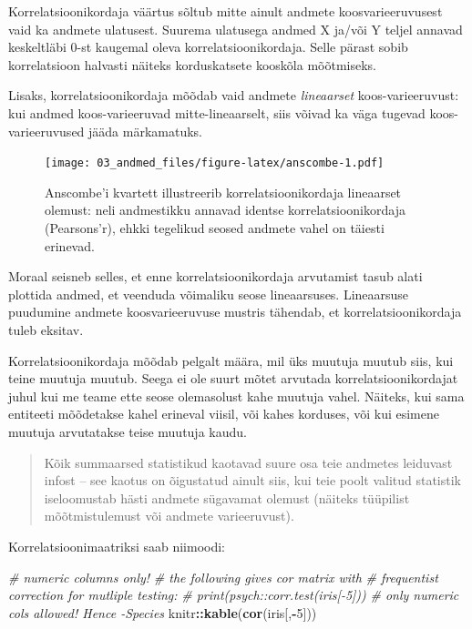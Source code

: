 \documentclass[]{book}
\newenvironment{Shaded}{\begin{snugshade}}{\end{snugshade}}
\newcommand{\KeywordTok}[1]{\textcolor[rgb]{0.13,0.29,0.53}{\textbf{#1}}}
\newcommand{\DecValTok}[1]{\textcolor[rgb]{0.00,0.00,0.81}{#1}}
\newcommand{\CommentTok}[1]{\textcolor[rgb]{0.56,0.35,0.01}{\textit{#1}}}
\newcommand{\OperatorTok}[1]{\textcolor[rgb]{0.81,0.36,0.00}{\textbf{#1}}}
\newcommand{\NormalTok}[1]{#1}
\begin{document}
Korrelatsioonikordaja väärtus sõltub mitte ainult andmete
koosvarieeruvusest vaid ka andmete ulatusest. Suurema ulatusega andmed X
ja/või Y teljel annavad keskeltläbi 0-st kaugemal oleva
korrelatsioonikordaja. Selle pärast sobib korrelatsioon halvasti näiteks
korduskatsete kooskõla mõõtmiseks.

Lisaks, korrelatsioonikordaja mõõdab vaid andmete \emph{lineaarset}
koos-varieeruvust: kui andmed koos-varieeruvad mitte-lineaarselt, siis
võivad ka väga tugevad koos-varieeruvused jääda märkamatuks.






\begin{figure}
\centering
\texttt{[image: 03\_andmed\_files/figure-latex/anscombe-1.pdf]}
\caption{\label{fig:anscombe}Anscombe'i kvartett illustreerib korrelatsioonikordaja
lineaarset olemust: neli andmestikku annavad identse
korrelatsioonikordaja (Pearsons'r), ehkki tegelikud seosed andmete vahel
on täiesti erinevad.}
\end{figure}

Moraal seisneb selles, et enne korrelatsioonikordaja arvutamist tasub
alati plottida andmed, et veenduda võimaliku seose lineaarsuses.
Lineaarsuse puudumine andmete koosvarieeruvuse mustris tähendab, et
korrelatsioonikordaja tuleb eksitav.

Korrelatsioonikordaja mõõdab pelgalt määra, mil üks muutuja muutub siis,
kui teine muutuja muutub. Seega ei ole suurt mõtet arvutada
korrelatsioonikordajat juhul kui me teame ette seose olemasolust kahe
muutuja vahel. Näiteks, kui sama entiteeti mõõdetakse kahel erineval
viisil, või kahes korduses, või kui esimene muutuja arvutatakse teise
muutuja kaudu.

\begin{quote}
Kõik summaarsed statistikud kaotavad suure osa teie andmetes leiduvast
infost -- see kaotus on õigustatud ainult siis, kui teie poolt valitud
statistik iseloomustab hästi andmete sügavamat olemust (näiteks
tüüpilist mõõtmistulemust või andmete varieeruvust).
\end{quote}

Korrelatsioonimaatriksi saab niimoodi:

\begin{Shaded}
\begin{Highlighting}[]
\CommentTok{# numeric columns only!}
\CommentTok{# the following gives cor matrix with }
\CommentTok{# frequentist correction for mutliple testing:}
\CommentTok{# print(psych::corr.test(iris[-5]))}
\CommentTok{# only numeric cols allowed! Hence -Species}
\NormalTok{knitr}\OperatorTok{::}\KeywordTok{kable}\NormalTok{(}\KeywordTok{cor}\NormalTok{(iris[,}\OperatorTok{-}\DecValTok{5}\NormalTok{]))}
\end{Highlighting}
\end{Shaded}
\end{document}
